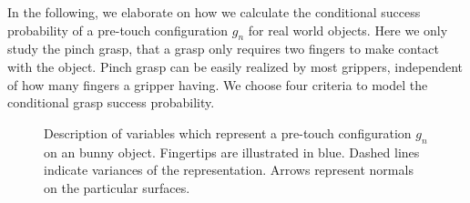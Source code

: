 In the following, we elaborate on how we calculate the conditional success probability of a pre-touch configuration $g_n$ for real world objects. Here we only study the pinch grasp, that a grasp only requires two fingers to make contact with the object. Pinch grasp can be easily realized by most grippers, independent of how many fingers a gripper having. We choose four criteria to model the conditional grasp success probability. 

\begin{figure}[!htbp]
\centering
\def\svgwidth{0.7\linewidth}

\caption{Description of variables which represent a pre-touch configuration $g_n$ on an bunny object. Fingertips are illustrated in blue. Dashed lines indicate variances of the representation. Arrows represent normals on the particular surfaces.}
\label{fig:grasp_generation}
\end{figure}

